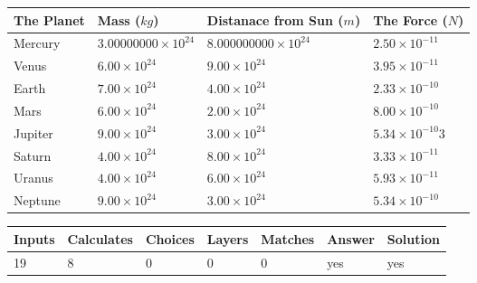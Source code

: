 \documentclass[12pt]{article}
\begin{document}
\vspace{0.2in}
 
 
\begin{tabular}{|l|l|l|l|}
\hline
The Planet & Mass ($kg$) & Distanace from Sun ($m$) & The Force ($N$)\\
\hline
Mercury  &
           $ %
3.00000000 \times 10^{24}  $   &
             $ %
8.000000000 \times 10^{24}$    & $ %
2.50 \times 10^{-11} $
\\  \hline
Venus    &
           $  %
6.00 \times 10^{24}  $     &
             $ %
9.00 \times 10^{24} $    & $ %
3.95 \times 10^{-11} $
\\  \hline
Earth    &
           $  %
7.00 \times 10^{24}$     &
             $ %
4.00 \times 10^{24} $    & $ %
2.33 \times 10^{-10} $
\\   \hline
Mars     &
           $  %
6.00 \times 10^{24} $     &
             $ %
2.00 \times 10^{24}$    & $ %
8.00 \times 10^{-10} $
\\   \hline
Jupiter  &
           $  %
9.00 \times 10^{24}  $    &
             $ %
3.00 \times 10^{24} $    & $ %
5.34 \times 10^{-10}3 $
\\  \hline
Saturn   &
           $  %
4.00 \times 10^{24}   $    &
             $ %
8.00 \times 10^{24}  $    & $ %
3.33 \times 10^{-11} $
\\  \hline
Uranus   &
           $  %
4.00 \times 10^{24} $    &
             $ %
6.00 \times 10^{24}$    & $ %
5.93 \times 10^{-11} $
\\  \hline
Neptune  &
           $  %
9.00 \times 10^{24}  $    &
             $ %
3.00 \times 10^{24} $    & $ %
5.34 \times 10^{-10} $
\\  \hline
 
\end{tabular}
 
 
 
 
\noindent{}
 
 

 
\vspace{0.3in}
   
   
   
   
\noindent\begin{tabular}{|l|l|l|l|l|l|l|}
 \hline
Inputs & Calculates & Choices & Layers & Matches & Answer & Solution \\ \hline
          19 & 
           8 & 
           0
  & 
           0 & 
           0 & 
  yes & 
  yes 
  \\ \hline
 \end{tabular}
   
\end{document}
